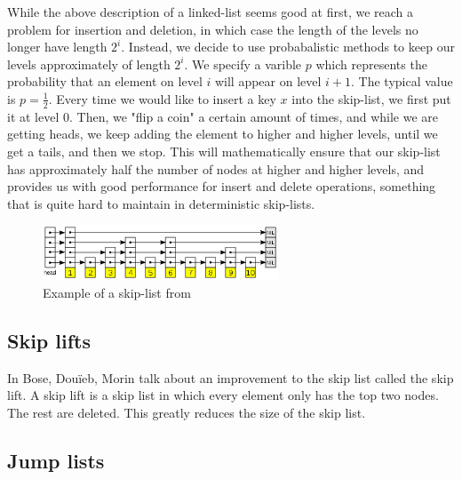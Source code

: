 \documentclass[oribibl]{llncs}
\begin{document}
While the above description of a linked-list seems good at first, we reach a problem for insertion and deletion, in which case the length of the levels no longer have length $2^i$. Instead, we decide to use probabalistic methods to keep our levels approximately of length $2^i$. We specify a varible $p$ which represents the probability that an element on level $i$ will appear on level $i+1$. The typical value is $p=\frac{1}{2}$. Every time we would like to insert a key $x$ into the skip-list, we first put it at level 0. Then, we "flip a coin" a certain amount of times, and while we are getting heads, we keep adding the element to higher and higher levels, until we get a tails, and then we stop. This will mathematically ensure that our skip-list has approximately half the number of nodes at higher and higher levels, and provides us with good performance for insert and delete operations, something that is quite hard to maintain in deterministic skip-lists.

\begin{figure}[here]
\center
\includegraphics[width=7cm]{images/skip_list}
\caption{Example of a skip-list from \cite{skip_list}}
\label{fig:skip_list}
\end{figure}

\subsection{Skip lifts}

In \cite{skip_lift} Bose, Douïeb, Morin talk about an improvement to the skip list called the skip lift. A skip lift is a skip list in which every element only has the top two nodes. The rest are deleted. This greatly reduces the size of the skip list.

\subsection{Jump lists}
\end{document}
